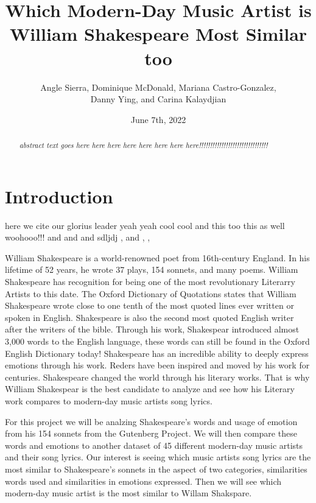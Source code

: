 \documentclass[11pt]{article}
\title {Which Modern-Day Music Artist is William Shakespeare Most Similar too\\[1ex]}
\author{
Angle Sierra, 
Dominique McDonald,
Mariana Castro-Gonzalez, \\
Danny Ying,
and Carina Kalaydjian \\[1ex]
}
\date{June 7th, 2022}
\newcommand{\abstractinenglishname}{Abstract}
\newenvironment{abstractinenglish}{
        \def\abstractname{\abstractinenglishname}
	\begin{abstract}
}{
        \end{abstract}
}
\begin{document}
\maketitle
\vspace{6pt}

\begin{abstractinenglish}
\emph{abstract text goes here here here here here here here here!!!!!!!!!!!!!!!!!!!!!!!!!!!!!!!}
\end{abstractinenglish}

\section{Introduction}

here we cite \cite{web1} our glorius leader \cite{web2} yeah yeah cool cool \cite{briney2015data} and this too \cite{monkey} this as well \cite{sonnetsData} woohooo!!! \cite{musicData} and \cite{syuzhet} and \cite{tm} and \cite{shakeFacts} sdljdj \cite{k-means} , \cite{NLP-for-music} and  \cite{NLP-for-lyrics}, \cite{knowledge-graphs}, \cite{nrc-sentiment}

William Shakespeare is a world-renowned poet from 16th-century England. In his lifetime of 52 years, he wrote 37 plays, 154 sonnets, and many poems\cite{shakeFacts}. William Shakespeare has recognition for being one of the most revolutionary Literarry Artists to this date\cite{shakeFacts}. The Oxford Dictionary of Quotations states that William Shakespeare wrote close to one tenth of the most quoted lines ever written or spoken in English\cite{shakeFacts}. Shakespeare is also the second most quoted English writer after the writers of the bible\cite{shakeFacts}. Through his work, Shakespear introduced almost  3,000 words to the English language, these words can still be found in the Oxford English Dictionary today\cite{shakeFacts}! Shakespeare has an incredible ability to deeply express emotions through his work. Reders have been inspired and moved by his work for centuries. Shakespeare changed the world through his literary works. That is why William Shakespear is the best candidate to analyze and see how his Literary work compares to modern-day music artists song lyrics. 

For this project we will be analzing Shakespeare's words and usage of emotion from his 154 sonnets from the Gutenberg Project\cite{sonnetsData}. We will then compare these words and emotions to another dataset of 45 different modern-day music artists and their song lyrics\cite{musicData}. Our interest is seeing which music artists song lyrics are the most similar to Shakespeare's sonnets in the aspect of two categories, similarities words used and similarities in emotions expressed. Then we will see which modern-day music artist is the most similar to Willam Shakspare.  
\end{document}
